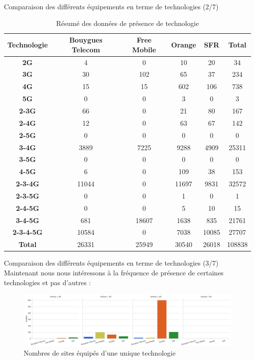 \begin{frame}{Comparaison des différents équipements en terme de technologies (2/7)}
    \begin{table}[!ht]
        \centering
        \footnotesize
        \begin{tabular}{cccccc}
        \hline
            \textbf{Technologie} & \textbf{Bouygues Telecom} & \textbf{Free Mobile} & \textbf{Orange} & \textbf{SFR} & \textbf{Total} \\ \hline
            \textbf{2G} & 4 & 0 & 10 & 20 & 34 \\ 
            \textbf{3G} & 30 & 102 & 65 & 37 & 234 \\ 
            \textbf{4G} & 15 & 15 & 602 & 106 & 738 \\ 
            \textbf{5G} & 0 & 0 & 3 & 0 & 3 \\ 
            \textbf{2-3G} & 66 & 0 & 21 & 80 & 167 \\ 
            \textbf{2-4G} & 12 & 0 & 63 & 67 & 142 \\ 
            \textbf{2-5G} & 0 & 0 & 0 & 0 & 0 \\ 
            \textbf{3-4G} & 3889 & 7225 & 9288 & 4909 & 25311 \\ 
            \textbf{3-5G} & 0 & 0 & 0 & 0 & 0 \\ 
            \textbf{4-5G} & 6 & 0 & 109 & 38 & 153 \\ 
            \textbf{2-3-4G} & 11044 & 0 & 11697 & 9831 & 32572 \\ 
            \textbf{2-3-5G} & 0 & 0 & 1 & 0 & 1 \\ 
            \textbf{2-4-5G} & 0 & 0 & 5 & 10 & 15 \\ 
            \textbf{3-4-5G} & 681 & 18607 & 1638 & 835 & 21761 \\ 
            \textbf{2-3-4-5G} & 10584 & 0 & 7038 & 10085 & 27707 \\ 
            \textbf{Total} & 26331 & 25949 & 30540 & 26018 & 108838 \\ \hline
        \end{tabular}
        \caption{Résumé des données de présence de technologie}
    \end{table}
\end{frame}

\begin{frame}{Comparaison des différents équipements en terme de technologies (3/7)}
    Maintenant nous nous intéressons à la fréquence de présence de certaines technologies et pas d'autres :
    \begin{figure}
        \includegraphics[height=0.4\paperheight]{images/barplots/xG.png}
        \caption{\label{fig:xG}Nombres de sites équipés d'une unique technologie}
    \end{figure}
\end{frame}

